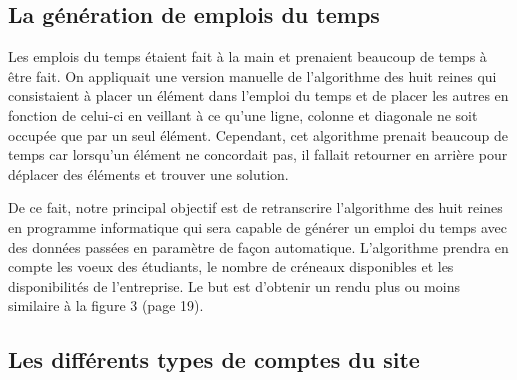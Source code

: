 \documentclass[12pt,a4paper]{article}
\begin{document}
\subsection{La génération de emplois du temps}

\begin{large}
\begin{onehalfspace}    Les emplois du temps étaient fait à la main et prenaient beaucoup de temps à être fait. On appliquait une version manuelle de l’algorithme des huit reines qui consistaient à placer un élément dans l’emploi du temps et de placer les autres en fonction de celui-ci en veillant à ce qu’une ligne, colonne et diagonale ne soit occupée que par un seul élément. Cependant, cet algorithme prenait beaucoup de temps car lorsqu’un élément ne concordait pas, il fallait retourner en arrière pour déplacer des éléments et trouver une solution.

    De ce fait, notre principal objectif est de retranscrire l’algorithme des huit reines en programme informatique qui sera capable de générer un emploi du temps avec des données passées en paramètre de façon automatique. L’algorithme prendra en compte les voeux des étudiants, le nombre de créneaux disponibles et les disponibilités de l’entreprise. Le but est d’obtenir un rendu plus ou moins similaire à la figure 3 (page 19).

\end{onehalfspace}
\end{large}

\subsection{Les différents types de comptes du site}
\end{document}
